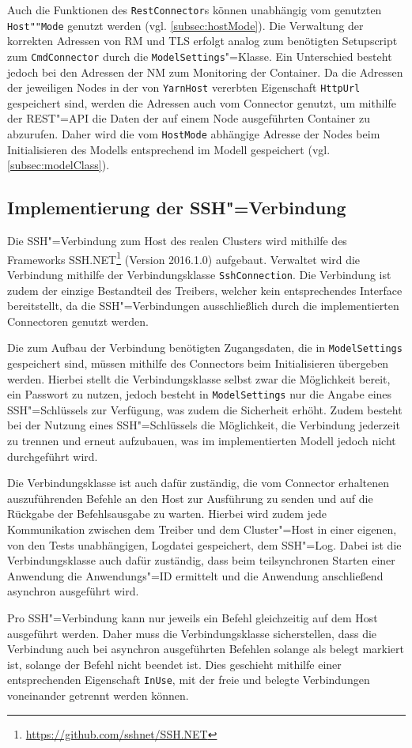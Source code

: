 Auch die Funktionen des \texttt{RestConnector}s können unabhängig vom genutzten \texttt{Host""Mode} genutzt werden (vgl. \cref{subsec:hostMode}).
Die Verwaltung der korrekten Adressen von \ac{RM} und \ac{TLS} erfolgt analog zum benötigten Setupscript zum \texttt{CmdConnector} durch die \texttt{ModelSettings}"=Klasse.
Ein Unterschied besteht jedoch bei den Adressen der \ac{NM} zum Monitoring der Container.
Da die Adressen der jeweiligen Nodes in der von \texttt{YarnHost} vererbten Eigenschaft \texttt{HttpUrl} gespeichert sind, werden die Adressen auch vom Connector genutzt, um mithilfe der REST"=API die Daten der auf einem Node ausgeführten Container zu abzurufen.
Daher wird die vom \texttt{HostMode} abhängige Adresse der Nodes beim Initialisieren des Modells entsprechend im Modell gespeichert (vgl. \cref{subsec:modelClass}).

\subsection{Implementierung der SSH"=Verbindung}
\label{subsec:sshConnection}

Die SSH"=Verbindung zum Host des realen Clusters wird mithilfe des Frameworks SSH.NET\footnote{\url{https://github.com/sshnet/SSH.NET}} (Version 2016.1.0) aufgebaut.
Verwaltet wird die Verbindung mithilfe der Verbindungsklasse \texttt{SshConnection}.
Die Verbindung ist zudem der einzige Bestandteil des Treibers, welcher kein entsprechendes Interface bereitstellt, da die SSH"=Verbindungen ausschließlich durch die implementierten Connectoren genutzt werden.

Die zum Aufbau der Verbindung benötigten Zugangsdaten, die in \texttt{ModelSettings} gespeichert sind, müssen mithilfe des Connectors beim Initialisieren übergeben werden.
Hierbei stellt die Verbindungsklasse selbst zwar die Möglichkeit bereit, ein Passwort zu nutzen, jedoch besteht in \texttt{ModelSettings} nur die Angabe eines SSH"=Schlüssels zur Verfügung, was zudem die Sicherheit erhöht.
Zudem besteht bei der Nutzung eines SSH"=Schlüssels die Möglichkeit, die Verbindung jederzeit zu trennen und erneut aufzubauen, was im implementierten Modell jedoch nicht durchgeführt wird.

Die Verbindungsklasse ist auch dafür zuständig, die vom Connector erhaltenen auszuführenden Befehle an den Host zur Ausführung zu senden und auf die Rückgabe der Befehlsausgabe zu warten.
Hierbei wird zudem jede Kommunikation zwischen dem Treiber und dem Cluster"=Host in einer eigenen, von den Tests unabhängigen, Logdatei gespeichert, dem SSH"=Log.
Dabei ist die Verbindungsklasse auch dafür zuständig, dass beim teilsynchronen Starten einer Anwendung die Anwendungs"=ID ermittelt und die Anwendung anschließend asynchron ausgeführt wird.

Pro SSH"=Verbindung kann nur jeweils ein Befehl gleichzeitig auf dem Host ausgeführt werden.
Daher muss die Verbindungsklasse sicherstellen, dass die Verbindung auch bei asynchron ausgeführten Befehlen solange als belegt markiert ist, solange der Befehl nicht beendet ist.
Dies geschieht mithilfe einer entsprechenden Eigenschaft \texttt{InUse}, mit der freie und belegte Verbindungen voneinander getrennt werden können.
